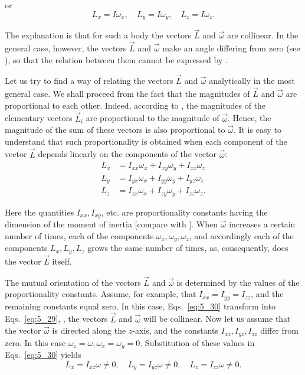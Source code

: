 \noindent
or
\begin{equation}\label{eq:5_29}
L_x = I\omega_x,\quad L_y = I\omega_y,\quad L_z = I\omega_z.
\end{equation}

\noindent
The explanation is that for such a body the vectors $\vec{L}$ and $\vec{\omega}$ are collinear. In the general case, however, the vectors $\vec{L}$ and $\vec{\omega}$ make an angle differing from zero (see ), so that the relation between them cannot be expressed by .

Let us try to find a way of relating the vectors $\vec{L}$ and $\vec{\omega}$ analytically in the most general case. We shall proceed from the fact that the magnitudes of $\vec{L}$ and $\vec{\omega}$ are proportional to each other. Indeed, according to , the magnitudes of the elementary vectors $\vec{L}_i$ are proportional to the magnitude of $\vec{\omega}$. Hence, the magnitude of the sum of these vectors is also proportional to $\vec{\omega}$. It is easy to understand that such proportionality is obtained when each component of the vector $\vec{L}$ depends linearly on the components of the vector $\vec{\omega}$:
\begin{align}
L_x &= I_{xx}\omega_x + I_{xy}\omega_y + I_{xz}\omega_z\nonumber\\
L_y &= I_{yx}\omega_x + I_{yy}\omega_y + I_{yz}\omega_z\label{eq:5_30}\\
L_z &= I_{zx}\omega_x + I_{zy}\omega_y + I_{zz}\omega_z.\nonumber
\end{align}

\noindent
Here the quantities $I_{xx}, I_{xy}$, etc. are proportionality constants having the dimension of the moment of inertia [compare with ]. When $\vec{\omega}$ increases a certain number of times, each of the components $\omega_x, \omega_y, \omega_z$, and accordingly each of the components $L_x, L_y, L_z$ grows the same number of times, as, consequently, does the vector $\vec{L}$ itself.

The mutual orientation of the vectors $\vec{L}$ and $\vec{\omega}$ is determined by the values of the proportionality constants. Assume, for example, that $I_{xx}=I_{yy}=I_{zz}$, and the remaining constants equal zero. In this case, Eqs.~\eqref{eq:5_30} transform into Eqs.~\eqref{eq:5_29}, \ie, the vectors $\vec{L}$ and $\vec{\omega}$ will be collinear. Now let us assume that the vector $\vec{\omega}$ is directed along the $z$-axis, and the constants $I_{xz}, I_{yz}, I_{zz}$ differ from zero. In this case $\omega_z=\omega, \omega_x=\omega_y=0$. Substitution of these values in Eqs.~\eqref{eq:5_30} yields
\begin{equation*}
L_x = I_{xz}\omega\neq 0,\quad L_y = I_{yz}\omega\neq 0,\quad L_z = I_{zz}\omega\neq 0.
\end{equation*}

